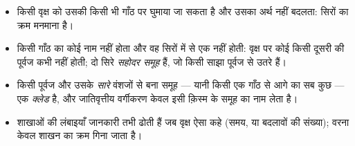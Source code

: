 \begin{proposition}[पढ़ने के नियम]\label{prop:g12:phylogenetic-trees:rules}
\begin{itemize}
  \item किसी वृक्ष को उसकी किसी भी गाँठ पर घुमाया जा सकता है और उसका अर्थ
        नहीं बदलता: सिरों का क्रम मनमाना है।
  \item किसी गाँठ का कोई नाम नहीं होता और वह सिरों में से एक नहीं होती:
        वृक्ष पर कोई  किसी दूसरी  की पूर्वज कभी नहीं होती; दो सिरे
        \emph{सहोदर समूह} हैं, जो किसी साझा पूर्वज से उतरे हैं।
  \item किसी पूर्वज और उसके \emph{सारे} वंशजों से बना समूह --- यानी किसी एक
        गाँठ से आगे का सब कुछ --- एक \emph{क्लेड} है, और
        जातिवृत्तीय वर्गीकरण केवल इसी क़िस्म के समूह का नाम लेता है।
  \item शाखाओं की लंबाइयाँ जानकारी तभी ढोती हैं जब वृक्ष ऐसा कहे (समय, या
        बदलावों की संख्या); वरना केवल शाखन का क्रम गिना जाता है।
\end{itemize}
\end{proposition}
\admitted

